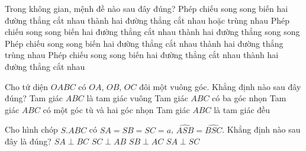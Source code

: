 \begin{ex}%
    Trong không gian, mệnh đề nào sau đây đúng?
    \choice
    {\True Phép chiếu song song biến hai đường thẳng cắt nhau thành hai đường thẳng cắt nhau hoặc trùng nhau}
    {Phép chiếu song song biến hai đường thẳng cắt nhau thành hai đường thẳng song song}
    {Phép chiếu song song biến hai đường thẳng cắt nhau thành hai đường thẳng trùng nhau}
    {Phép chiếu song song biến hai đường thẳng cắt nhau thành hai đường thẳng cắt nhau}
\end{ex}

\begin{ex}%
    Cho tứ diện $OABC$ có $OA$, $OB$, $OC$ đôi một vuông góc. Khẳng định nào sau đây đúng?
    \choice
    {Tam giác $ABC$ là tam giác vuông}
    {\True Tam giác $ABC$ có ba góc nhọn}
    {Tam giác $ABC$ có một góc tù và hai góc nhọn}
    {Tam giác $ABC$ là tam giác đều}
\end{ex}

\begin{ex}%
    Cho hình chóp $S.ABC$ có $SA=SB=SC=a$, $\widehat{ASB}=\widehat{BSC}$. Khẳng định nào sau đây là đúng?
    \choice
    {$SA\perp BC$}
    {$SC\perp AB$}
    {\True $SB\perp AC$}
    {$SA\perp SC$}
\end{ex}

